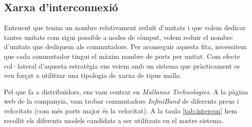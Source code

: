 \subsection{Xarxa d'interconnexió}

Entenent que tenim un nombre relativament reduït d'unitats i que volem dedicar tantes unitats com 
sigui possible a nodes de còmput, volem reduir el nombre d'unitats que dediquem als commutadors. Per aconseguir aquesta fita, necessitem que cada commutador tingui el màxim
nombre de ports per unitat.
Com efecte col·lateral d'aquesta estratègia ens veiem amb un sistema que pràcticament es veu forçat a utilitzar una tipologia de xarxa de tipus malla.

Pel que fa a distribuïdors, ens vam centrar en \textit{Mallanox Technologies}. A la pàgina web
\cite{mellanox-web} de la companyia, vam trobar commutadors \textit{InfiniBand} de diferents preus
i velocitats (com més ports major és la velocitat). A la taula \ref{tab:intercon} hem recollit els 
diferents models candidats a ser utilitzats en el nostre sistema.

\begin{table}[H]
\begin{adjustwidth}{-.5in}{-.5in}  
    \begin{center}
        \centering
    \caption{Comparació entre les diferents configuracions dels nodes.}
    \label{tab:intercon}
    \end{center}
\end{adjustwidth}
\end{table}

